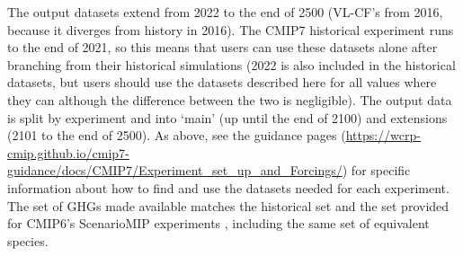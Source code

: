 The output datasets extend from 2022 to the end of 2500
(VL-CF's from 2016, because it diverges from history in 2016).
The CMIP7 historical experiment runs to the end of 2021,
so this means that users can use these datasets alone after branching from their historical simulations
(2022 is also included in the historical datasets,
but users should use the datasets described here for all values where they can
although the difference between the two is negligible).
The output data is split by experiment
and into `main' (up until the end of 2100) and extensions (2101 to the end of 2500).
As above, see the guidance pages \newline
(\mbox{\url{https://wcrp-cmip.github.io/cmip7-guidance/docs/CMIP7/Experiment_set_up_and_Forcings/}})
for specific information about how to find and use the datasets needed for each experiment.
The set of GHGs made available matches the historical set \citep{nicholls_historical-ghgs_2026}
and the set provided for CMIP6's ScenarioMIP experiments \citep{meinshausen_ssp-ghgs_2020},
including the same set of equivalent species.
